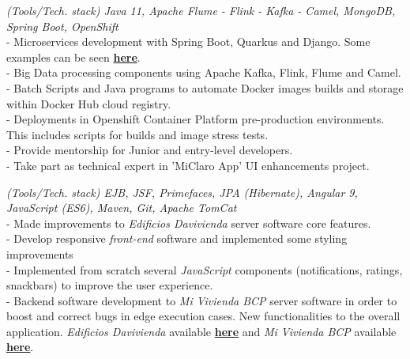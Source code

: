 \documentclass[]{CV-JuanCamiloFlorez}
\begin{document}
\begin{minipage}[t]{0.66\textwidth}
    \noindent
    \textit{(Tools/Tech. stack) Java 11, Apache Flume - Flink - Kafka - Camel, MongoDB, Spring Boot, OpenShift} \\
        - Microservices development with Spring Boot, Quarkus and Django. Some examples can be seen \textbf{\href{https://github.com/VanJFlorez/flink-kafka-fraud-detection}{here}}. \\
        - Big Data processing components using Apache Kafka, Flink, Flume and Camel. \\
        - Batch Scripts and Java programs to automate Docker images builds and storage within Docker Hub cloud registry. \\
        - Deployments in Openshift Container Platform pre-production environments. This includes scripts for builds and image stress tests. \\
        - Provide mentorship for Junior and entry-level developers. \\
        - Take part as technical expert in 'MiClaro App' UI enhancements project. \\
        \sectionsep

    \noindent
    \textit{(Tools/Tech. stack) EJB, JSF, Primefaces, JPA (Hibernate), Angular 9, JavaScript (ES6), Maven, Git, Apache TomCat} \\
        - Made improvements to \textit{Edificios Davivienda} server software core features. \\
        - Develop responsive \textit{front-end} software and implemented some styling improvements \\
        - Implemented from scratch several \textit{JavaScript} components (notifications, ratings, snackbars) to improve the user experience. \\
        - Backend software development to \textit{Mi Vivienda BCP} server software in order to boost and correct bugs in edge execution cases. New functionalities to the overall application. \textit{Edificios Davivienda} available \textbf{\href{https://www.edificiosdavivienda.com}{here}} and \textit{Mi Vivienda BCP} available \textbf{\href{https://www.miviviendabcp.com.bo}{here}}. \\
        \sectionsep


\end{minipage}
\end{document}

